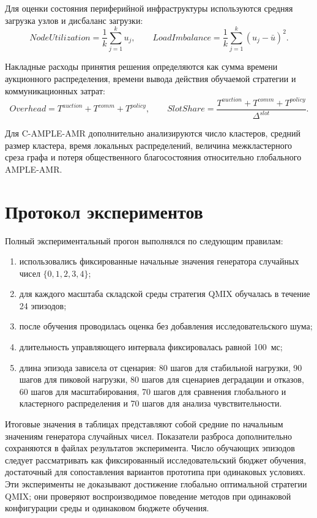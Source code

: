 Для оценки состояния периферийной инфраструктуры используются средняя загрузка узлов и дисбаланс загрузки:
\[
NodeUtilization = \frac{1}{k}\sum_{j=1}^{k}u_j,
\qquad
LoadImbalance = \frac{1}{k}\sum_{j=1}^{k}(u_j-\bar{u})^2.
\]

Накладные расходы принятия решения определяются как сумма времени аукционного распределения, времени вывода действия обучаемой стратегии и коммуникационных затрат:
\[
Overhead = T^{auction}+T^{comm}+T^{policy},
\qquad
SlotShare = \frac{T^{auction}+T^{comm}+T^{policy}}{\Delta^{slot}}.
\]

Для C-AMPLE-AMR дополнительно анализируются число кластеров, средний размер кластера, время локальных распределений, величина межкластерного среза графа и потеря общественного благосостояния относительно глобального AMPLE-AMR.

\section{Протокол экспериментов}

Полный экспериментальный прогон выполнялся по следующим правилам:
\begin{enumerate}
    \item использовались фиксированные начальные значения генератора случайных чисел $\{0,1,2,3,4\}$;
    \item для каждого масштаба складской среды стратегия QMIX обучалась в течение 24 эпизодов;
    \item после обучения проводилась оценка без добавления исследовательского шума;
    \item длительность управляющего интервала фиксировалась равной 100~мс;
    \item длина эпизода зависела от сценария: 80 шагов для стабильной нагрузки, 90 шагов для пиковой нагрузки, 80 шагов для сценариев деградации и отказов, 60 шагов для масштабирования, 70 шагов для сравнения глобального и кластерного распределения и 70 шагов для анализа чувствительности.
\end{enumerate}

Итоговые значения в таблицах представляют собой средние по начальным значениям генератора случайных чисел. Показатели разброса дополнительно сохраняются в файлах результатов эксперимента. Число обучающих эпизодов следует рассматривать как фиксированный исследовательский бюджет обучения, достаточный для сопоставления вариантов прототипа при одинаковых условиях. Эти эксперименты не доказывают достижение глобально оптимальной стратегии QMIX; они проверяют воспроизводимое поведение методов при одинаковой конфигурации среды и одинаковом бюджете обучения.

